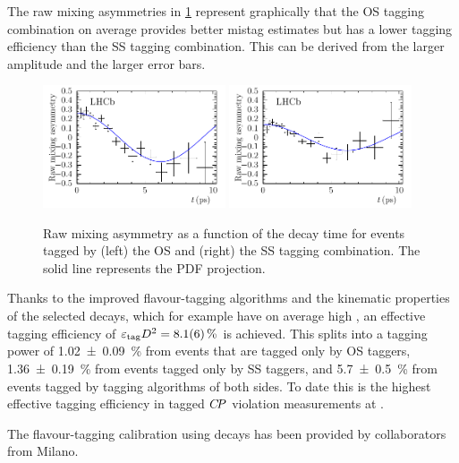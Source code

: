 The raw mixing asymmetries in
\cref{fig:dataanalysis:taggingcalibration:dsdcalibration:rawasymmetries}
represent graphically that the OS tagging combination on average provides
better mistag estimates but has a lower tagging efficiency than the SS tagging
combination. This can be derived from the larger amplitude and the larger
error bars.

\begin{figure}[htb]
\centering
\includegraphics[width=0.48\textwidth]{05-DataAnalysis/tikz/pdf/DsD_MixingAsym_OSComb.pdf}
\includegraphics[width=0.48\textwidth]{05-DataAnalysis/tikz/pdf/DsD_MixingAsym_SSComb.pdf}
\caption{Raw mixing asymmetry as a function of the \Bd decay time for events
tagged by (left) the OS and (right) the SS tagging combination. The solid line
represents the PDF projection.}
\label{fig:dataanalysis:taggingcalibration:dsdcalibration:rawasymmetries}
\end{figure}

Thanks to the improved flavour-tagging algorithms and the kinematic properties
of the selected \BdToDD decays, which for example have on average high \pT, an
effective tagging efficiency of $\etag D^2= \SI{8.1\pm0.6}{\percent}$ is
achieved. This splits into a tagging power of \SI{1.02\pm0.09}{\percent} from
events that are tagged only by OS taggers, \SI{1.36\pm0.19}{\percent} from
events tagged only by SS taggers, and \SI{5.7\pm0.5}{\percent} from events
tagged by tagging algorithms of both sides. To date this is the highest
effective tagging efficiency in tagged $\CP$ violation measurements at \lhcb.

The flavour-tagging calibration using \BdToDsD decays has been provided by
collaborators from Milano.